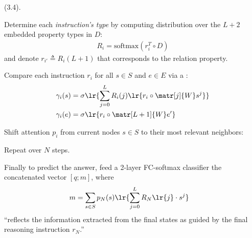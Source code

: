 \documentclass[11pt]{article}
\begin{document}
 (3.4). 
\begin{compactenum}
	\item Determine each \textit{instruction's type} by computing distribution over the $L+2$ embedded property types in $D$:
	\begin{align}
	R_i = \text{softmax}(r_i^T \circ D)
	\end{align}
	and denote $r_{i'} \triangleq R_i(L+1)$ that corresponds to the relation property. 
	
	\item Compare each instruction $r_i$ for all $s \in S$ and $e \in E$ via a :
	\begin{align}
	\gamma_i(s)
	&= \sigma \lr{ \sum_{j=0}^{L} R_i(j)\lr{  r_i \circ \matr[j]{W} s^j  }  } \\
	\gamma_i(e)
	&= \sigma \lr{   r_i \circ \matr[L+1]{W} e' }
	\end{align}
	
	\item Shift attention $p_i$ from current nodes $s \in S$ to their most relevant neighbors:
	
	\item Repeat over $N$ steps. 
\end{compactenum}
Finally to predict the answer, feed a 2-layer FC-softmax classifier the concatenated vector $[q; m]$, where
\begin{align}
m &= \sum_{s \in S} p_N(s) \lr{ \sum_{j=0}^L R_N\lr{j} \cdot s^j }
\end{align}
``reflects the information extracted from the final states as guided by the final reasoning instruction $r_N$.''




\end{document}
